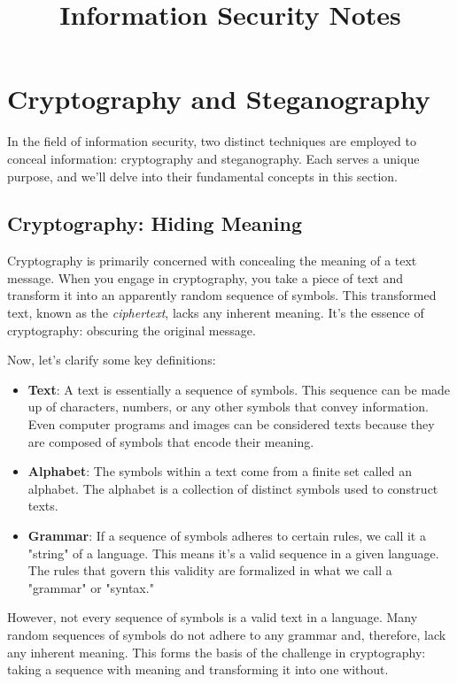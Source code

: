 \documentclass{class}
\title{Information Security Notes}
\begin{document}
\maketitle
\section{Cryptography and Steganography}

In the field of information security, two distinct techniques are employed to conceal information: cryptography and steganography.
Each serves a unique purpose, and we'll delve into their fundamental concepts in this section.

\subsection{Cryptography: Hiding Meaning}

Cryptography is primarily concerned with concealing the meaning of a text message.
When you engage in cryptography, you take a piece of text and transform it into an apparently random sequence of symbols.
This transformed text, known as the \textit{ciphertext}, lacks any inherent meaning. It's the essence of cryptography: obscuring the original message.

Now, let's clarify some key definitions:

\begin{itemize}
      \item \textbf{Text}: A text is essentially a sequence of symbols. This sequence can be made up of characters,
            numbers, or any other symbols that convey information.
            Even computer programs and images can be considered texts because they are composed of symbols that encode their meaning.
      \item \textbf{Alphabet}: The symbols within a text come from a finite set called an alphabet.
            The alphabet is a collection of distinct symbols used to construct texts.
      \item \textbf{Grammar}: If a sequence of symbols adheres to certain rules, we call it a "string" of a language.
            This means it's a valid sequence in a given language. The rules that govern this validity are formalized in what we call a "grammar" or "syntax."
\end{itemize}

However, not every sequence of symbols is a valid text in a language.
Many random sequences of symbols do not adhere to any grammar and, therefore, lack any inherent meaning.
This forms the basis of the challenge in cryptography: taking a sequence with meaning and transforming it into one without.
\end{document}

